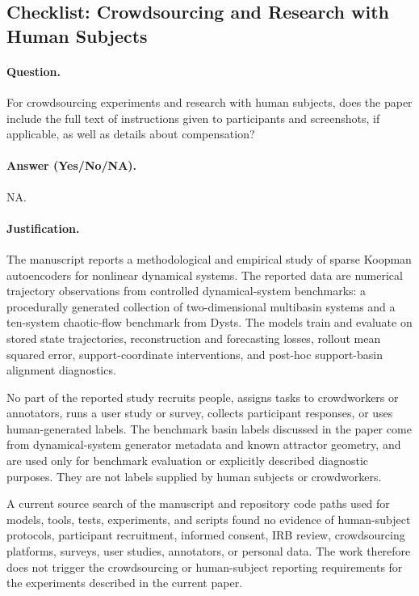 \subsection{Checklist: Crowdsourcing and Research with Human Subjects}
\label{app:checklist_human_subjects}

\paragraph{Question.}
For crowdsourcing experiments and research with human subjects, does the paper
include the full text of instructions given to participants and screenshots, if
applicable, as well as details about compensation?

\paragraph{Answer (Yes/No/NA).}
NA.

\paragraph{Justification.}
The manuscript reports a methodological and empirical study of sparse Koopman
autoencoders for nonlinear dynamical systems. The reported data are numerical
trajectory observations from controlled dynamical-system benchmarks: a
procedurally generated collection of two-dimensional multibasin systems and a
ten-system chaotic-flow benchmark from Dysts. The models train and evaluate on
stored state trajectories, reconstruction and forecasting losses, rollout mean
squared error, support-coordinate interventions, and post-hoc support-basin
alignment diagnostics.

No part of the reported study recruits people, assigns tasks to crowdworkers or
annotators, runs a user study or survey, collects participant responses, or
uses human-generated labels. The benchmark basin labels discussed in the paper
come from dynamical-system generator metadata and known attractor geometry, and
are used only for benchmark evaluation or explicitly described diagnostic
purposes. They are not labels supplied by human subjects or crowdworkers.

A current source search of the manuscript and repository code paths used for
models, tools, tests, experiments, and scripts found no evidence of
human-subject protocols, participant recruitment, informed consent, IRB review,
crowdsourcing platforms, surveys, user studies, annotators, or personal data.
The work therefore does not trigger the crowdsourcing or human-subject reporting
requirements for the experiments described in the current paper.

